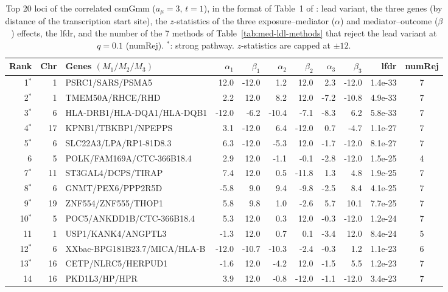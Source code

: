 \begin{table}[htbp]
\centering
\caption{Top 20 loci of the correlated csmGmm ($a_\mu=3$, $t=1$), in the format of Table~1 of \citet{Sun2025}: lead variant, the three genes (by distance of the transcription start site), the $z$-statistics of the three exposure--mediator ($\alpha$) and mediator--outcome ($\beta$) effects, the lfdr, and the number of the 7 methods of Table~\ref{tab:med-ldl-methods} that reject the lead variant at $q=0.1$ (numRej). $^{*}$: strong pathway. $z$-statistics are capped at $\pm12$.}
\label{tab:med-ldl-top}
\scriptsize\setlength{\tabcolsep}{3pt}
\begin{tabular}{r r l rr rr rr r c}
\toprule
Rank & Chr & Genes $(M_1/M_2/M_3)$ & $\alpha_1$ & $\beta_1$ & $\alpha_2$ & $\beta_2$ & $\alpha_3$ & $\beta_3$ & lfdr & numRej\\
\midrule
1$^{*}$ & 1 & PSRC1/SARS/PSMA5 & 12.0 & -12.0 & 1.2 & 12.0 & 2.3 & -12.0 & 1.4e-33 & 7\\
2$^{*}$ & 1 & TMEM50A/RHCE/RHD & 2.2 & 12.0 & 8.2 & 12.0 & -7.2 & -10.8 & 4.9e-33 & 7\\
3$^{*}$ & 6 & HLA-DRB1/HLA-DQA1/HLA-DQB1 & -12.0 & -6.2 & -10.4 & -7.1 & -8.3 & 6.2 & 5.8e-33 & 7\\
4$^{*}$ & 17 & KPNB1/TBKBP1/NPEPPS & 3.1 & -12.0 & 6.4 & -12.0 & 0.7 & -4.7 & 1.1e-27 & 7\\
5$^{*}$ & 6 & SLC22A3/LPA/RP1-81D8.3 & 6.3 & -12.0 & -5.3 & 12.0 & -1.7 & -12.0 & 8.1e-27 & 7\\
6 & 5 & POLK/FAM169A/CTC-366B18.4 & 2.9 & 12.0 & -1.1 & -0.1 & -2.8 & -12.0 & 1.5e-25 & 4\\
7$^{*}$ & 11 & ST3GAL4/DCPS/TIRAP & 7.4 & 12.0 & 0.5 & -11.8 & 1.3 & 4.8 & 1.9e-25 & 7\\
8$^{*}$ & 6 & GNMT/PEX6/PPP2R5D & -5.8 & 9.0 & 9.4 & -9.8 & -2.5 & 8.4 & 4.1e-25 & 7\\
9$^{*}$ & 19 & ZNF554/ZNF555/THOP1 & 5.8 & 9.8 & 1.0 & -2.6 & 5.7 & 10.1 & 7.7e-25 & 7\\
10$^{*}$ & 5 & POC5/ANKDD1B/CTC-366B18.4 & 5.3 & 12.0 & 0.3 & 12.0 & -0.3 & -12.0 & 1.2e-24 & 7\\
11 & 1 & USP1/KANK4/ANGPTL3 & -1.3 & 12.0 & 0.7 & 0.1 & -3.4 & 12.0 & 8.4e-24 & 5\\
12$^{*}$ & 6 & XXbac-BPG181B23.7/MICA/HLA-B & -12.0 & -10.7 & -10.3 & -2.4 & -0.3 & 1.2 & 1.1e-23 & 6\\
13$^{*}$ & 16 & CETP/NLRC5/HERPUD1 & -1.6 & 12.0 & -4.2 & 12.0 & -1.5 & 5.5 & 1.2e-23 & 7\\
14 & 16 & PKD1L3/HP/HPR & 3.9 & 12.0 & -0.8 & -12.0 & -1.1 & -12.0 & 3.4e-23 & 7\\

\end{tabular}
\end{table}
